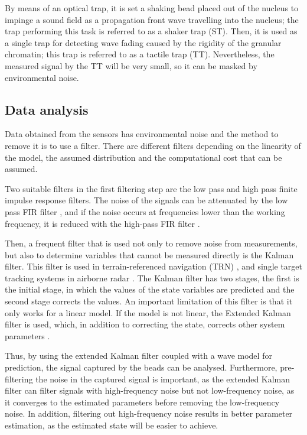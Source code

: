 \documentclass[12pt, a4paper]{article} %
\begin{document}
	By means of an optical trap, it is set a shaking bead placed out of the nucleus to impinge a sound field as a propagation front wave travelling into the nucleus; the trap performing this task is referred to as a shaker trap (ST). Then, it is used as a single trap for detecting wave fading caused by the rigidity of the granular chromatin; this trap is referred to as a tactile trap (TT). Nevertheless, the measured signal by the TT will be very small, so it can be masked by environmental noise. 
	
	\setlength{\parskip}{0mm}
	
	\subsection{Data analysis}
	
	Data obtained from the sensors has environmental noise and the method to remove it is to use a filter. There are different filters depending on the linearity of the model, the assumed distribution and the computational cost that can be assumed. 
	
	\setlength{\parskip}{4mm}
	
	Two suitable filters in the first filtering step are the low pass and high pass finite impulse response filters. The noise of the signals can be attenuated by the low pass FIR filter \cite{rabiner1973approximate}, and if the noise occurs at frequencies lower than the working frequency, it is reduced with the high-pass FIR filter \cite{mondal2012novel}.
	
	Then, a frequent filter that is used not only to remove noise from measurements, but also to determine variables that cannot be measured directly is the Kalman filter. This filter is used in terrain-referenced navigation (TRN) \cite{kim2018introduction}, and single target tracking systems in airborne radar \cite{pearson1974Kalman}. The Kalman filter has two stages, the first is the initial stage, in which the values of the state variables are predicted and the second stage corrects the values. An important limitation of this filter is that it only works for a linear model. If the model is not linear, the Extended Kalman filter is used, which, in addition to correcting the state, corrects other system parameters \cite{ribeiro2004Kalman}.
	
	Thus, by using the extended Kalman filter coupled with a wave model for prediction, the signal captured by the beads can be analysed. Furthermore, pre-filtering the noise in the captured signal is important, as the extended Kalman filter can filter signals with high-frequency noise but not low-frequency noise, as it converges to the estimated parameters before removing the low-frequency noise. In addition, filtering out high-frequency noise results in better parameter estimation, as the estimated state will be easier to achieve.
	
\end{document}
